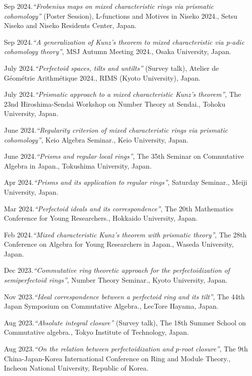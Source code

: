 \documentclass[10pt,a4paper,sans]{moderncv}
\begin{document}
\begin{etaremune}
  \item Sep 2024.\emph{``Frobenius maps on mixed characteristic rings via prismatic cohomology''} (Poster Session), \textsf{L-functions and Motives in Niseko 2024.}, Setsu Niseko and Niseko Residents Center, Japan.
  \item Sep 2024.\emph{``A generalization of Kunz's theorem to mixed characteristic via p-adic cohomology theory''}, \textsf{MSJ Autumn Meeting 2024.}, Osaka University, Japan.
  \item July 2024.\emph{``Perfectoid spaces, tilts and untilts''} (Survey talk), \textsf{Atelier de Géométrie Arithmétique 2024.}, RIMS (Kyoto University), Japan.
  \item July 2024.\emph{``Prismatic approach to a mixed characteristic Kunz's theorem''}, \textsf{The 23nd Hiroshima-Sendai Workshop on Number Theory at Sendai.}, Tohoku University, Japan.
  \item June 2024.\emph{``Regularity criterion of mixed characteristic rings via prismatic cohomology''}, \textsf{Keio Algebra Seminar.}, Keio University, Japan.
  \item June 2024.\emph{``Prisms and regular local rings''}, \textsf{The 35th Seminar on Commutative Algebra in Japan.}, Tokushima University, Japan.
  \item Apr 2024.\emph{``Prisms and its application to regular rings''}, \textsf{Saturday Seminar.}, Meiji University, Japan.
  \item Mar 2024.\emph{``Perfectoid ideals and its correspondence''}, \textsf{The 20th Mathematics Conference for Young Researchers.}, Hokkaido University, Japan.
  \item Feb 2024.\emph{``Mixed characteristic Kunz's theorem with prismatic theory''}, \textsf{The 28th Conference on Algebra for Young Researchers in Japan.}, Waseda University, Japan.
  \item Dec 2023.\emph{``Commutative ring theoretic approach for the perfectoidization of semiperfectoid rings''}, \textsf{Number Theory Seminar.}, Kyoto University, Japan.
  \item Nov 2023.\emph{``Ideal correspondence between a perfectoid ring and its tilt''}, \textsf{The 44th Japan Symposium on Commutative Algebra.}, LecTore Hayama, Japan.
  \item Aug 2023.\emph{``Absolute integral closure''} (Survey talk), \textsf{The 18th Summer School on Commutative algebra.}, Tokyo Institute of Technology, Japan.
  \item Aug 2023.\emph{``On the relation between perfectoidization and \(p\)-root closure''}, \textsf{The 9th China-Japan-Korea International Conference on Ring and Module Theory.}, Incheon National University, Republic of Korea.

\end{etaremune}
\end{document}
